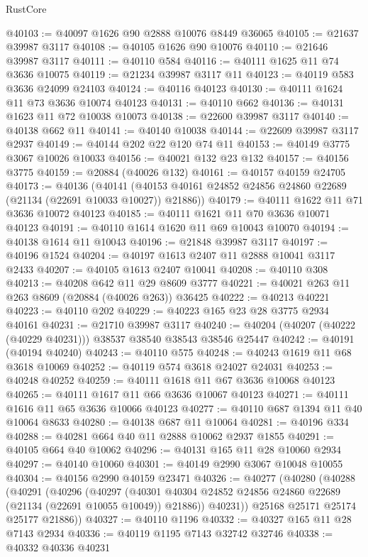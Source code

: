 \begin{lexlean}{RustCore}
\begin{coremodule}
@40103 := @40097 @1626 @90 @2888 @10076 @8449 @36065
@40105 := @21637 @39987 @3117
@40108 := @40105 @1626 @90 @10076
@40110 := @21646 @39987 @3117
@40111 := @40110 @584
@40116 := @40111 @1625 @11 @74 @3636 @10075
@40119 := @21234 @39987 @3117 @11
@40123 := @40119 @583 @3636 @24099 @24103
@40124 := @40116 @40123
@40130 := @40111 @1624 @11 @73 @3636 @10074 @40123
@40131 := @40110 @662
@40136 := @40131 @1623 @11 @72 @10038 @10073
@40138 := @22600 @39987 @3117
@40140 := @40138 @662 @11
@40141 := @40140 @10038
@40144 := @22609 @39987 @3117 @2937
@40149 := @40144 @202 @22 @120 @74 @11
@40153 := @40149 @3775 @3067 @10026 @10033
@40156 := @40021 @132 @23 @132
@40157 := @40156 @3775
@40159 := @20884 (@40026 @132)
@40161 := @40157 @40159 @24705
@40173 := @40136
    (@40141 (@40153 @40161 @24852 @24856 @24860 @22689 (@21134 (@22691 @10033 @10027)) @21886))
@40179 := @40111 @1622 @11 @71 @3636 @10072 @40123
@40185 := @40111 @1621 @11 @70 @3636 @10071 @40123
@40191 := @40110 @1614 @1620 @11 @69 @10043 @10070
@40194 := @40138 @1614 @11 @10043
@40196 := @21848 @39987 @3117
@40197 := @40196 @1524
@40204 := @40197 @1613 @2407 @11 @2888 @10041 @3117 @2433
@40207 := @40105 @1613 @2407 @10041
@40208 := @40110 @308
@40213 := @40208 @642 @11 @29 @8609 @3777
@40221 := @40021 @263 @11 @263 @8609 (@20884 (@40026 @263)) @36425
@40222 := @40213 @40221
@40223 := @40110 @202
@40229 := @40223 @165 @23 @28 @3775 @2934 @40161
@40231 := @21710 @39987 @3117
@40240 := @40204 (@40207 (@40222 (@40229 @40231))) @38537 @38540 @38543 @38546 @25447
@40242 := @40191 (@40194 @40240)
@40243 := @40110 @575
@40248 := @40243 @1619 @11 @68 @3618 @10069
@40252 := @40119 @574 @3618 @24027 @24031
@40253 := @40248 @40252
@40259 := @40111 @1618 @11 @67 @3636 @10068 @40123
@40265 := @40111 @1617 @11 @66 @3636 @10067 @40123
@40271 := @40111 @1616 @11 @65 @3636 @10066 @40123
@40277 := @40110 @687 @1394 @11 @40 @10064 @8633
@40280 := @40138 @687 @11 @10064
@40281 := @40196 @334
@40288 := @40281 @664 @40 @11 @2888 @10062 @2937 @1855
@40291 := @40105 @664 @40 @10062
@40296 := @40131 @165 @11 @28 @10060 @2934
@40297 := @40140 @10060
@40301 := @40149 @2990 @3067 @10048 @10055
@40304 := @40156 @2990 @40159 @23471
@40326 := @40277
    (@40280
      (@40288
        (@40291
          (@40296
            (@40297
              (@40301 @40304 @24852 @24856 @24860 @22689 (@21134 (@22691 @10055 @10049)) @21886))
            @40231))
        @25168
        @25171
        @25174
        @25177
        @21886))
@40327 := @40110 @1196
@40332 := @40327 @165 @11 @28 @7143 @2934
@40336 := @40119 @1195 @7143 @32742 @32746
@40338 := @40332 @40336 @40231

\end{coremodule}
\end{lexlean}
